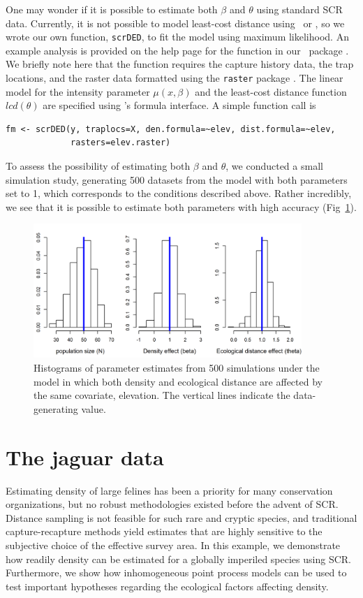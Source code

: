 One may wonder if it is possible to estimate both $\beta$
and $\theta$ using standard SCR data. Currently, it is not possible to
model least-cost distance using \jags~or \secr, so we wrote our own
function, \verb+scrDED+, to fit the model using maximum likelihood. An
example analysis is provided on the help page for the function in our
\R~package \scrbook. We briefly note here that the function requires
the capture history data, the trap locations, and the raster data
formatted using the {\tt raster} package
\citep{hijmans_vanetten:2012}. The linear model for the
intensity parameter $\mu(x, \beta)$ and the least-cost distance
function $lcd(\theta)$ are specified using \R's formula interface. A
simple function call is
\begin{verbatim}
fm <- scrDED(y, traplocs=X, den.formula=~elev, dist.formula=~elev,
             rasters=elev.raster)
\end{verbatim}
To assess the possibility of estimating both $\beta$ and $\theta$, we
conducted a small simulation study, generating 500 datasets from the
model with both parameters set to 1, which corresponds to the
conditions described above. Rather incredibly, we see that it is
possible to estimate both parameters with high accuracy
(Fig~\ref{ch9.fig.sim}).

\begin{figure}[ht]
\centering
\includegraphics[width=4in,height=2in]{Ch11/figs/scrDEDsim}
\caption{Histograms of parameter estimates from 500 simulations under
  the model in which both density and ecological distance are affected
by the same covariate, elevation. The vertical lines indicate the
data-generating value.}
\label{ch9.fig.sim}
\end{figure}



\section{The jaguar data}

Estimating density of large felines has been a priority for many
conservation organizations, but no robust methodologies existed before
the advent of SCR. Distance sampling is not feasible for such rare and
cryptic species, and traditional capture-recapture methods yield
estimates that are highly sensitive to the subjective choice of the
effective survey area. In this example, we
demonstrate how readily density can be estimated for a
globally imperiled species using SCR. Furthermore, we show how
inhomogeneous point process models can be used to test important
hypotheses regarding the ecological factors affecting density.

